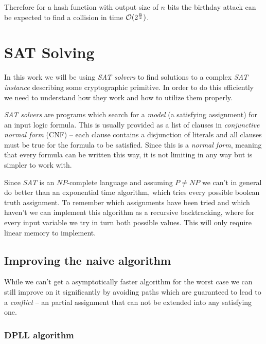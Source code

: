 Therefore for a hash function with output size of $n$ bits the birthday attack can be expected to find a collision in time $\mathcal{O}(2^\frac{n}{2})$.



\chapter{SAT Solving}

In this work we will be using \emph{SAT solvers} to find solutions to a complex \emph{SAT instance} describing some cryptographic primitive.
In order to do this efficiently we need to understand how they work and how to utilize them properly.

\emph{SAT solvers} are programs which search for a \emph{model} (a satisfying assignment) for an input logic formula.
This is usually provided as a list of clauses in \emph{conjunctive normal form} (CNF) -- each clause contains a disjunction of literals and all clauses must be true for the formula to be satisfied.
Since this is a \emph{normal form}, meaning that every formula can be written this way, it is not limiting in any way but is simpler to work with.

Since \emph{SAT} is an $NP$-complete language and assuming $P \neq NP$ we can't in general do better than an exponential time algorithm, which tries every possible boolean truth assignment.
To remember which assignments have been tried and which haven't we can implement this algorithm as a recursive backtracking, where for every input variable we try in turn both possible values.
This will only require linear memory to implement.

\section{Improving the naive algorithm}

While we can't get a asymptotically faster algorithm for the worst case we can still improve on it significantly by avoiding paths which are guaranteed to lead to a \emph{conflict} -- an partial assignment that can not be extended into any satisfying one.

\subsection{DPLL algorithm}


